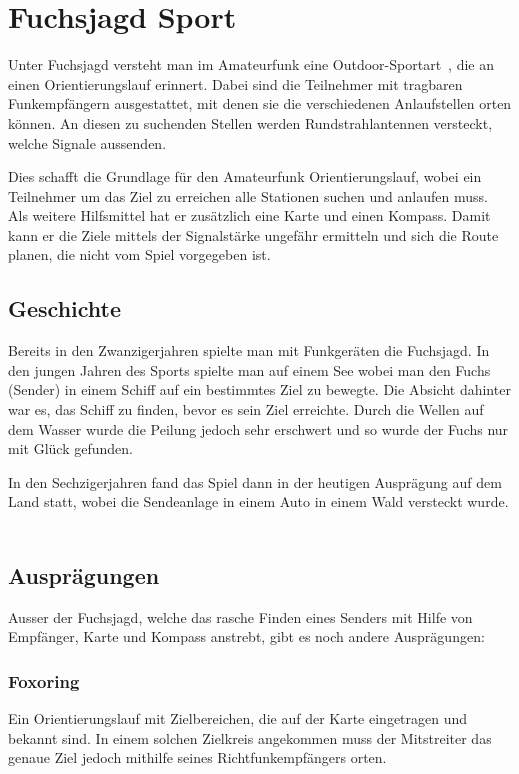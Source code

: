 
\newpage
\section{Fuchsjagd Sport} %
\label{sec:Fuchsjagd Sport}

Unter Fuchsjagd versteht man im Amateurfunk eine Outdoor-Sportart~\cite{bib:amateurfunk_wiki}, die an einen Orientierungslauf erinnert. Dabei sind die Teilnehmer mit tragbaren Funkempfängern ausgestattet, mit denen sie die verschiedenen Anlaufstellen orten können. An diesen zu suchenden Stellen werden Rundstrahlantennen versteckt, welche Signale aussenden.

Dies schafft die Grundlage für den Amateurfunk Orientierungslauf, wobei ein Teilnehmer um das Ziel zu erreichen alle Stationen suchen und anlaufen muss. Als weitere Hilfsmittel hat er zusätzlich eine Karte und einen Kompass. Damit kann er die Ziele mittels der Signalstärke ungefähr ermitteln und sich die Route planen, die nicht vom Spiel vorgegeben ist. 

\subsection{Geschichte} %
\label{sub:Geschichte}

Bereits in den Zwanzigerjahren spielte man mit Funkgeräten die Fuchsjagd. In den jungen Jahren des Sports spielte man auf einem See wobei man den Fuchs (Sender) in einem Schiff auf ein bestimmtes Ziel zu bewegte. Die Absicht dahinter war es, das Schiff zu finden, bevor es sein Ziel erreichte. Durch die Wellen auf dem Wasser wurde die Peilung jedoch sehr erschwert und so wurde der Fuchs nur mit Glück gefunden.

In den Sechzigerjahren fand das Spiel dann in der heutigen Ausprägung auf dem Land statt, wobei die Sendeanlage in einem Auto in einem Wald versteckt wurde. ~\cite{bib:ardf}

\subsection{Ausprägungen} %
\label{sub:Ausprägungen}

Ausser der Fuchsjagd, welche das rasche Finden eines Senders mit Hilfe von Empfänger, Karte und Kompass anstrebt, gibt es noch andere Ausprägungen:

\subsubsection{Foxoring} %
\label{ssub:Foxoring}
Ein Orientierungslauf mit Zielbereichen, die auf der Karte eingetragen und bekannt sind. In einem solchen Zielkreis angekommen muss der Mitstreiter das genaue Ziel jedoch mithilfe seines Richtfunkempfängers orten.

